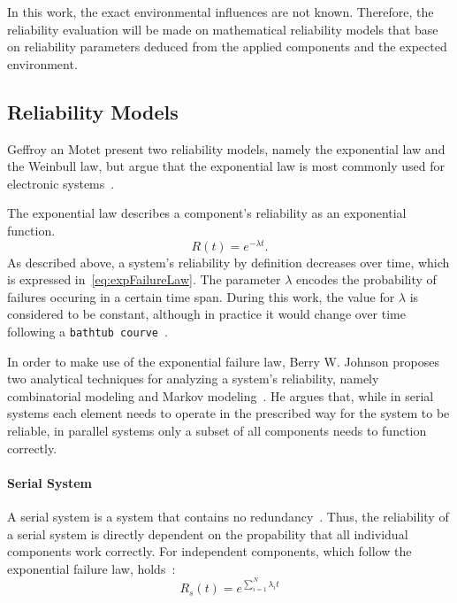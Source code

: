 In this work, the exact environmental influences are not known.
Therefore, the reliability evaluation will be made on mathematical reliability models that base on reliability parameters deduced from the applied components and the expected environment.

\subsection{Reliability Models}
Geffroy an Motet present two reliability models, namely the exponential law and the Weinbull law, but argue that the exponential law is most commonly used for electronic systems~\cite{GeffroyMotetDependableComputing}.

The exponential law describes a component's reliability as an exponential function.
\begin{equation}
R(t) = e^{-\lambda t}.
\label{eq:expFailureLaw}
\end{equation}
As described above, a system's reliability by definition decreases over time, which is expressed in~\autoref{eq:expFailureLaw}.
The parameter $\lambda$ encodes the probability of failures occuring in a certain time span.
During this work, the value for $\lambda$ is considered to be constant, although in practice it would change over time following a \texttt{bathtub courve}~\cite{GeffroyMotetDependableComputing}.

In order to make use of the exponential failure law, Berry W. Johnson proposes two analytical techniques for analyzing a system's reliability, namely combinatorial modeling and Markov modeling~\cite{BarryFaultToleranceAnalysis}.
He argues that, while in serial systems each element needs to operate in the prescribed way for the system to be reliable, in parallel systems only a subset of all components needs to function correctly.

\paragraph{Serial System}
A serial system is a system that contains no redundancy~\cite{BarryFaultToleranceAnalysis}.
Thus, the reliability of a serial system is directly dependent on the propability that all individual components work correctly.
For independent components, which follow the exponential failure law, holds~\cite{BarryFaultToleranceAnalysis}:
\begin{equation}
R_s(t) = e^{\sum_{i = 1}^N \lambda_i t}
\label{eq:combReliabSerial}
\end{equation}

